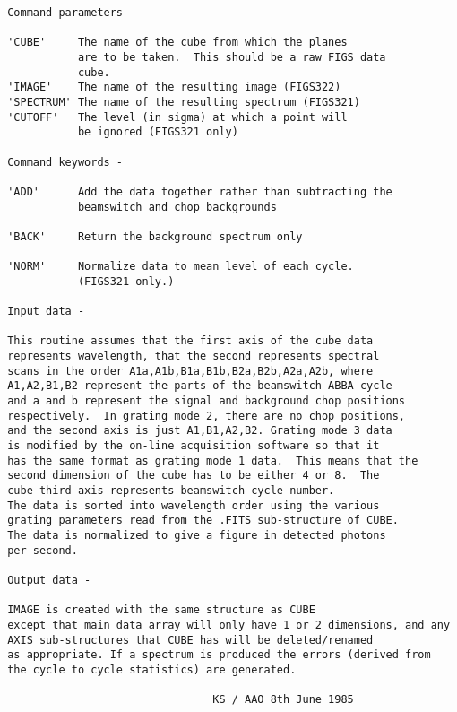 \begin{description}
\begin{verbatim}
 Command parameters -

 'CUBE'     The name of the cube from which the planes
            are to be taken.  This should be a raw FIGS data
            cube.
 'IMAGE'    The name of the resulting image (FIGS322)
 'SPECTRUM' The name of the resulting spectrum (FIGS321)
 'CUTOFF'   The level (in sigma) at which a point will
            be ignored (FIGS321 only)

 Command keywords -

 'ADD'      Add the data together rather than subtracting the
            beamswitch and chop backgrounds

 'BACK'     Return the background spectrum only

 'NORM'     Normalize data to mean level of each cycle.
            (FIGS321 only.)

 Input data -

 This routine assumes that the first axis of the cube data
 represents wavelength, that the second represents spectral
 scans in the order A1a,A1b,B1a,B1b,B2a,B2b,A2a,A2b, where
 A1,A2,B1,B2 represent the parts of the beamswitch ABBA cycle
 and a and b represent the signal and background chop positions
 respectively.  In grating mode 2, there are no chop positions,
 and the second axis is just A1,B1,A2,B2. Grating mode 3 data
 is modified by the on-line acquisition software so that it
 has the same format as grating mode 1 data.  This means that the
 second dimension of the cube has to be either 4 or 8.  The
 cube third axis represents beamswitch cycle number.
 The data is sorted into wavelength order using the various
 grating parameters read from the .FITS sub-structure of CUBE.
 The data is normalized to give a figure in detected photons
 per second.

 Output data -

 IMAGE is created with the same structure as CUBE
 except that main data array will only have 1 or 2 dimensions, and any
 AXIS sub-structures that CUBE has will be deleted/renamed
 as appropriate. If a spectrum is produced the errors (derived from
 the cycle to cycle statistics) are generated.

                                 KS / AAO 8th June 1985
\end{verbatim}
\end{description}
